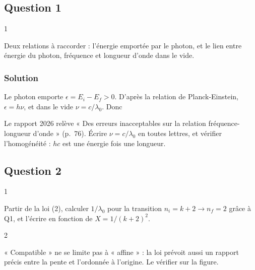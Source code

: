 \documentclass[11pt,a4paper]{article}
\newcommand{\equationajustee}[1]{%
  \sbox{\boiteequation}{$\displaystyle #1$}%
  \ifdim\wd\boiteequation>\linewidth
    \[\resizebox{\linewidth}{!}{\usebox{\boiteequation}}\]%
  \else
    \[#1\]%
  \fi}
\begin{document}
\hypertarget{question-1}{%
\subsection{Question 1}\label{question-1}}

\begin{indication}{1}

Deux relations à raccorder : l'énergie emportée par le photon, et le lien entre énergie du photon, fréquence et longueur d'onde dans le vide.

\end{indication}

\hypertarget{solution}{%
\subsubsection{Solution}\label{solution}}

Le photon emporte \(\epsilon=E_i-E_f>0\). D'après la relation de Planck-Einstein, \(\epsilon=h\nu\), et dans le vide \(\nu=c/\lambda_0\). Donc

\equationajustee{\boxed{\lambda_0=\frac{hc}{E_i-E_f}}}

\begin{jury}

Le rapport 2026 relève « Des erreurs inacceptables sur la relation fréquence-longueur d'onde » (p.~76). Écrire \(\nu=c/\lambda_0\) en toutes lettres, et vérifier l'homogénéité : \(hc\) est une énergie fois une longueur.

\end{jury}

\hypertarget{question-2}{%
\subsection{Question 2}\label{question-2}}

\begin{indication}{1}

Partir de la loi (2), calculer \(1/\lambda_0\) pour la transition \(n_i=k+2\to n_f=2\) grâce à Q1, et l'écrire en fonction de \(X=1/(k+2)^2\).

\end{indication}

\begin{indication}{2}

« Compatible » ne se limite pas à « affine » : la loi prévoit aussi un rapport précis entre la pente et l'ordonnée à l'origine. Le vérifier sur la figure.

\end{indication}
\end{document}
